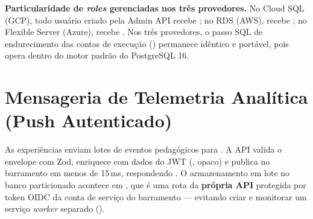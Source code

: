 \begin{nota}
\textbf{Particularidade de \emph{roles} gerenciadas nos três provedores.} No
Cloud SQL (GCP), todo usuário criado pela Admin API recebe ;
no RDS (AWS), recebe ; no Flexible Server (Azure), recebe
. Nos três provedores, o passo SQL de endurecimento das
contas de execução ()
permanece idêntico e portável, pois opera dentro do motor padrão do PostgreSQL 16.
\end{nota}

\section{Mensageria de Telemetria Analítica (Push Autenticado)}

As experiências enviam lotes de eventos pedagógicos para . A API valida o envelope com Zod, enriquece com dados do JWT
(,  opaco) e publica no barramento em menos de
15\,ms, respondendo . O armazenamento em lote no banco particionado
acontece em , que é uma rota da \textbf{própria API}
protegida por token OIDC da conta de serviço do barramento --- evitando criar e
monitorar um serviço \emph{worker} separado ().

